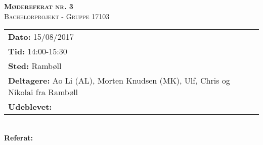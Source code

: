 
\newcommand{\HRule}{\rule{\linewidth}{0.1mm}}


	\begin{center}
		{\huge \bfseries \textsc{Mødereferat nr. 3}}\\
		\textsc{\large Bachelorprojekt - Gruppe 17103}\\[0.3cm]
	\end{center}
	\begin{tabular}{ll}
	\large \textbf{Dato:} 15/08/2017  	\\ %
	\large \textbf{Tid:}  14:00-15:30 	\\ %
	\large \textbf{Sted:} Rambøll		\\ %
	\large \textbf{Deltagere:} Ao Li (AL), Morten Knudsen (MK), Ulf, Chris og Nikolai fra Rambøll \\
	\large \textbf{Udeblevet:}
	\end{tabular}\\
	\phantom{\,}\hspace{0.1em} \large \textbf{Referat:}
